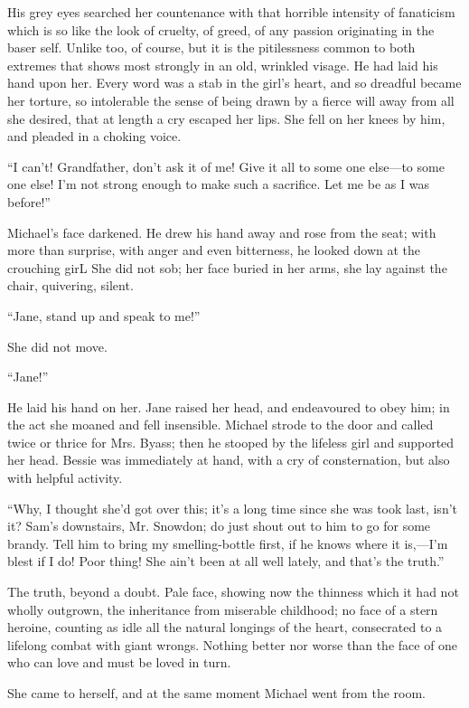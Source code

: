 His grey eyes searched her countenance with that horrible intensity of
fanaticism which is so like the look of cruelty, of greed, of any
passion originating in the baser self. Unlike too, of course, but it is
the pitilessness common to both extremes that shows most strongly in an
old, wrinkled visage. He had laid his hand upon her. Every word was a
stab in the girl's heart, and so dreadful became her torture, so
intolerable the sense of being drawn by a fierce will away from all she
desired, that at length a cry escaped her lips. She fell on her knees by
him, and pleaded in a choking voice.

``I can't! Grandfather, don't ask it of me! Give it all to some one
else---to some one else! I'm not strong enough to make such a sacrifice.
Let me be as I was before!''

Michael's face darkened. He drew his hand away and rose from the seat;
with more than {}surprise, with anger and even bitterness, he looked
down at the crouching girL She did not sob; her face buried in her arms,
she lay against the chair, quivering, silent.

``Jane, stand up and speak to me!''

She did not move.

``Jane!''

He laid his hand on her. Jane raised her head, and endeavoured to obey
him; in the act she moaned and fell insensible. Michael strode to the
door and called twice or thrice for Mrs. Byass; then he stooped by the
lifeless girl and supported her head. Bessie was immediately at hand,
with a cry of consternation, but also with helpful activity.

``Why, I thought she'd got over this; it's a long time since she was
took last, isn't it? Sam's downstairs, Mr. Snowdon; do just shout out to
him to go for some brandy. Tell him to bring my smelling-bottle first,
if he knows where it is,---I'm blest if I do! Poor thing! She ain't been
at all well lately, and that's the truth.''

The truth, beyond a doubt. Pale face, showing now the thinness which it
had not wholly outgrown, the inheritance from {}miserable childhood; no
face of a stern heroine, counting as idle all the natural longings of
the heart, consecrated to a lifelong combat with giant wrongs. Nothing
better nor worse than the face of one who can love and must be loved in
turn.

She came to herself, and at the same moment Michael went from the room.

